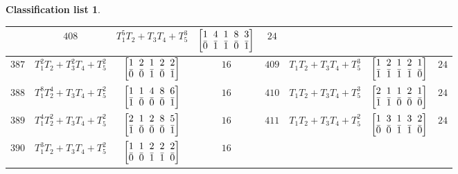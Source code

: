 \documentclass[pdftex]{sigma}%
\theoremstyle{definition}
\newtheorem{class-list}[thm]{Classification list}
\numberwithin{equation}{section}
\begin{document}
\begin{class-list}
\begin{table}[h!]
\begin{tabu}{c|c|c|c||c|c|c|c}
&${408}$&${T_{1}^{5}T_{2}+T_{3}T_{4}+T_{5}^{3}}$
&$\arraycolsep=1mm\begin{bmatrix}{1} & {4} & {1} & {8} & {3} \\ {\bar{0}} & {\bar{1}} & {\bar{1}} & {\bar{0}} & {\bar{1}}\end{bmatrix}$&${24}$
\\
\hline
${387}$&${T_{1}^{2}T_{2}+T_{3}^{2}T_{4}+T_{5}^{2}}$
&$\arraycolsep=1mm\begin{bmatrix}{1} & {2} & {1} & {2} & {2} \\ {\bar{0}} & {\bar{0}} & {\bar{1}} & {\bar{0}} & {\bar{1}}\end{bmatrix}$&${16}$
&${409}$&${T_{1}T_{2}+T_{3}T_{4}+T_{5}^{3}}$
&$\arraycolsep=1mm\begin{bmatrix}{1} & {2} & {1} & {2} & {1} \\ {\bar{1}} & {\bar{1}} & {\bar{1}} & {\bar{1}} & {\bar{0}}\end{bmatrix}$&${24}$
\\
\hline
${388}$&${T_{1}^{8}T_{2}^{4}+T_{3}T_{4}+T_{5}^{2}}$
&$\arraycolsep=1mm\begin{bmatrix}{1} & {1} & {4} & {8} & {6} \\ {\bar{1}} & {\bar{0}} & {\bar{0}} & {\bar{0}} & {\bar{1}}\end{bmatrix}$&${16}$
&${410}$&${T_{1}T_{2}+T_{3}T_{4}+T_{5}^{3}}$
&$\arraycolsep=1mm\begin{bmatrix}{2} & {1} & {1} & {2} & {1} \\ {\bar{1}} & {\bar{1}} & {\bar{0}} & {\bar{0}} & {\bar{0}}\end{bmatrix}$&${24}$
\\
\hline
${389}$&${T_{1}^{4}T_{2}^{2}+T_{3}T_{4}+T_{5}^{2}}$
&$\arraycolsep=1mm\begin{bmatrix}{2} & {1} & {2} & {8} & {5} \\ {\bar{1}} & {\bar{0}} & {\bar{0}} & {\bar{0}} & {\bar{1}}\end{bmatrix}$&${16}$
&${411}$&${T_{1}T_{2}+T_{3}T_{4}+T_{5}^{2}}$
&$\arraycolsep=1mm\begin{bmatrix}{1} & {3} & {1} & {3} & {2} \\ {\bar{0}} & {\bar{0}} & {\bar{1}} & {\bar{1}} & {\bar{0}}\end{bmatrix}$&${24}$
\\
\hline
${390}$&${T_{1}^{3}T_{2}+T_{3}T_{4}+T_{5}^{2}}$
&$\arraycolsep=1mm\begin{bmatrix}{1} & {1} & {2} & {2} & {2} \\ {\bar{0}} & {\bar{0}} & {\bar{1}} & {\bar{1}} & {\bar{0}}\end{bmatrix}$&${16}$
\\
\end{tabu}%
\end{table}
\end{class-list}
\end{document}
